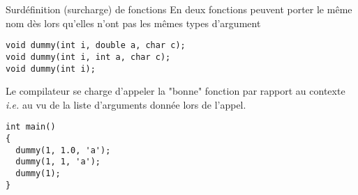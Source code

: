 \documentclass[c]{beamer}
\begin{document}

\begin{frame}[fragile]{Surdéfinition (surcharge) de fonctions}
 En \Cpp deux fonctions peuvent porter le même nom dès lors qu'elles n'ont pas
les mêmes types d'argument

\begin{verbatim}
void dummy(int i, double a, char c);
void dummy(int i, int a, char c);
void dummy(int i);
\end{verbatim}

\pause
Le compilateur se charge d'appeler la "bonne" fonction par rapport au contexte
\emph{i.e.} au vu de la liste d'arguments donnée lors de l'appel.

\begin{verbatim}
int main()
{
  dummy(1, 1.0, 'a');
  dummy(1, 1, 'a');
  dummy(1);
}
\end{verbatim}
\end{frame}


\begin{comment}
\begin{frame}[fragile]{Fonction \texttt{inline}}
 \structure{Les fonctions en ligne} remplacent (avantageusement) les macros utilisées en C
tout en conservant un temps d'exécution plus court

\vskip +10pt
On remplacera ainsi la déclaration en C
\begin{verbatim}
// Macro en C
#define CARRE(x) ((x) * (x))
\end{verbatim}
par
\begin{verbatim}
// Fonction en ligne en C++
inline double carre(const double x) { return x*x; }
\end{verbatim}
\end{frame}
\end{comment}
\end{document}
